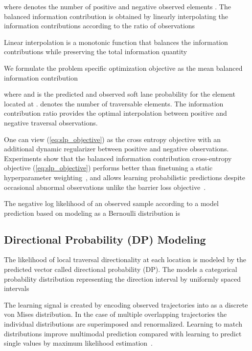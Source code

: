 \documentclass[letterpaper, 10 pt, conference]{ieeeconf}
\begin{document}
where  denotes the number of positive and negative observed elements . The balanced information contribution  is obtained by linearly interpolating the information contributions according to the ratio of observations


Linear interpolation is a monotonic function that balances the information contributions while preserving the total information quantity


We formulate the problem specific optimization objective  as the mean balanced information contribution

\noindent where  and  is the predicted and observed soft lane probability for the element located at .  denotes the number of traversable elements. The information contribution ratio  provides the optimal interpolation between positive and negative traversal observations.



One can view (\ref{eq:slp_objective}) as the cross entropy objective with an additional dynamic regularizer between positive and negative observations. Experiments show that the balanced information contribution cross-entropy objective (\ref{eq:slp_objective}) performs better than finetuning a static hyperparameter weighting~\cite{karlsson2020dsla}, and allows learning probabilistic predictions despite occasional abnormal observations unlike the barrier loss objective~\cite{karlsson2021gdsla}.


The negative log likelihood  of an observed sample  according to a model prediction  based on modeling  as a Bernoulli distribution is







\subsection{Directional Probability (DP) Modeling}

The likelihood of local traversal directionality at each location  is modeled by the predicted vector  called directional probability (DP). The  models a categorical probability distribution representing the direction interval  by  uniformly spaced intervals


The learning signal is created by encoding observed trajectories into  as a discrete von Mises distribution. In the case of multiple overlapping trajectories the individual distributions are superimposed and renormalized. Learning to match distributions improve multimodal prediction compared with learning to predict single values by maximum likelihood estimation~\cite{karlsson2020dsla}.
\end{document}

